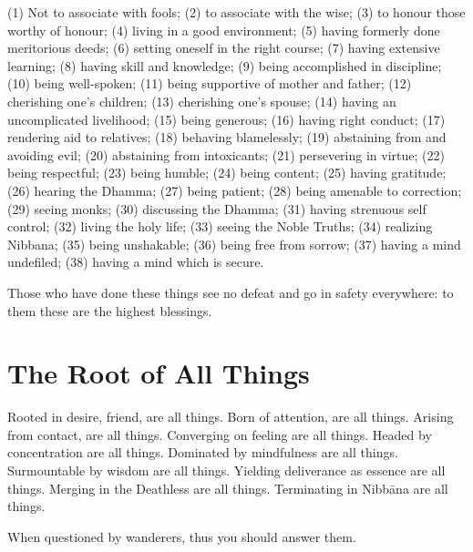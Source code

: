 (1) Not to associate with fools;
(2) to associate with the wise;
(3) to honour those worthy of honour;
(4) living in a good environment;
(5) having formerly done meritorious deeds;
(6) setting oneself in the right course;
(7) having extensive learning;
(8) having skill and knowledge;
(9) being accomplished in discipline;
(10) being well-spoken;
(11) being supportive of mother and father;
(12) cherishing one's children;
(13) cherishing one's spouse;
(14) having an uncomplicated livelihood;
(15) being generous;
(16) having right conduct;
(17) rendering aid to relatives;
(18) behaving blamelessly;
(19) abstaining from and avoiding evil;
(20) abstaining from intoxicants;
(21) persevering in virtue;
(22) being respectful;
(23) being humble;
(24) being content;
(25) having gratitude;
(26) hearing the Dhamma;
(27) being patient;
(28) being amenable to correction;
(29) seeing monks;
(30) discussing the Dhamma;
(31) having strenuous self control;
(32) living the holy life;
(33) seeing the Noble Truths;
(34) realizing Nibbana;
(35) being unshakable;
(36) being free from sorrow;
(37) having a mind undefiled;
(38) having a mind which is secure.

Those who have done these things see no defeat and go in safety everywhere: to
them these are the highest blessings.


\ifhandbookedition
\vspace*{-\baselineskip}
\fi

\section*{The Root of All Things}

Rooted in desire, friend, are all things.
Born of attention, are all things.
Arising from contact, are all things.
Converging on feeling are all things.
Headed by concentration are all things.
Dominated by mindfulness are all things.
Surmountable by wisdom are all things.
Yielding deliverance as essence are all things.
Merging in the Deathless are all things.
Terminating in Nibbāna are all things.

When questioned by wanderers, thus you should answer them.


